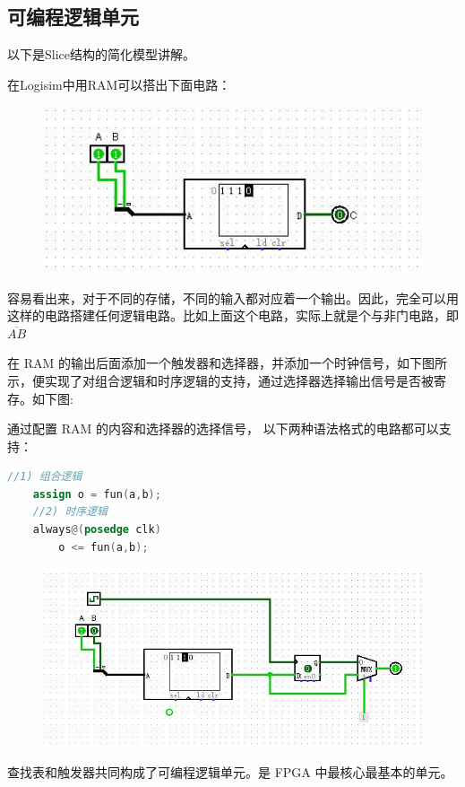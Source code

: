 \documentclass[UTF8]{article}
\begin{document}
	\subsection{可编程逻辑单元}
	以下是Slice结构的简化模型讲解。\par
	在Logisim中用RAM可以搭出下面电路：\par
	\begin{figure}[H]
		\centering
		\includegraphics[width=1\linewidth]{s3_1.jpg}
		\label{s3_1}
	\end{figure}
	容易看出来，对于不同的存储，不同的输入都对应着一个输出。因此，完全可以用这样的电路搭建任何逻辑电路。比如上面这个电路，实际上就是个与非门电路，即$\overline{AB}$\par
	在 RAM 的输出后面添加一个触发器和选择器，并添加一个时钟信号，如下图所示，便实现了对组合逻辑和时序逻辑的支持，通过选择器选择输出信号是否被寄存。如下图:\par
	
	通过配置 RAM 的内容和选择器的选择信号， 以下两种语法格式的电路都可以支持：\par
	\begin{lstlisting}[language=Verilog]
	//1) 组合逻辑
	assign o = fun(a,b); 
	//2) 时序逻辑
	always@(posedge clk)
		o <= fun(a,b);
	\end{lstlisting}\par
	\begin{figure}[H]
		\centering
		\includegraphics[width=1\linewidth]{s3_2.jpg}
		\label{s3_2}
	\end{figure}
	查找表和触发器共同构成了可编程逻辑单元。是 FPGA 中最核心最基本的单元。\par
\end{document}
